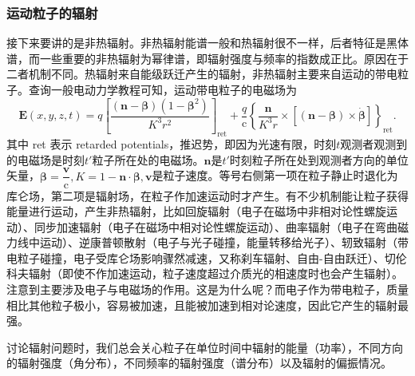 \documentclass[../天体物理基础.tex]{subfiles}
\begin{document}
\subsubsection{运动粒子的辐射}
接下来要讲的是非热辐射。非热辐射能谱一般和热辐射很不一样，后者特征是黑体谱，而一些重要的非热辐射为幂律谱，即辐射强度与频率的指数成正比。原因在于二者机制不同。热辐射来自能级跃迁产生的辐射，非热辐射主要来自运动的带电粒子。查询一般电动力学教程可知，运动带电粒子的电磁场为
\begin{equation}
\boldsymbol{E}\left(x,y,z,t\right)=q\left[\frac{\left(\boldsymbol{n}-\boldsymbol{\beta}\right)\left(1-\boldsymbol{\beta}^{2}\right)}{K^{3}r^{2}}\right]_{\text{ret}}+\frac{q}{\mathrm{c}}\left\{\frac{\boldsymbol{n}}{K^{3}r}\times\left[\left(\boldsymbol{n}-\boldsymbol{\beta}\right)\times\dot{\boldsymbol{\beta}}\right]\right\}_{\text{ret}}.\label{1.3.38}
\end{equation}
其中 ret 表示 retarded potentials，推迟势，即因为光速有限，时刻$t$观测者观测到的电磁场是时刻$t'$粒子所在处的电磁场。$\boldsymbol{n}$是$t'$时刻粒子所在处到观测者方向的单位矢量，$\boldsymbol{\beta}=\dfrac{\boldsymbol{v}}{\mathrm{c}},K=1-\boldsymbol{n}\cdot\boldsymbol{\beta},\boldsymbol{v}$是粒子速度。等号右侧第一项在粒子静止时退化为库仑场，第二项是辐射场，在粒子作加速运动时才产生。有不少机制能让粒子获得能量进行运动，产生非热辐射，比如回旋辐射（电子在磁场中非相对论性螺旋运动）、同步加速辐射（电子在磁场中相对论性螺旋运动）、曲率辐射（电子在弯曲磁力线中运动）、逆康普顿散射（电子与光子碰撞，能量转移给光子）、轫致辐射（带电粒子碰撞，电子受库仑场影响骤然减速，又称刹车辐射、自由{}-{}自由跃迁）、切伦科夫辐射（即使不作加速运动，粒子速度超过介质光的相速度时也会产生辐射）。注意到主要涉及电子与电磁场的作用。这是为什么呢？而电子作为带电粒子，质量相比其他粒子极小，容易被加速，且能被加速到相对论速度，因此它产生的辐射最强。

讨论辐射问题时，我们总会关心粒子在单位时间中辐射的能量（功率），不同方向的辐射强度（角分布），不同频率的辐射强度（谱分布）以及辐射的偏振情况。
\end{document}
